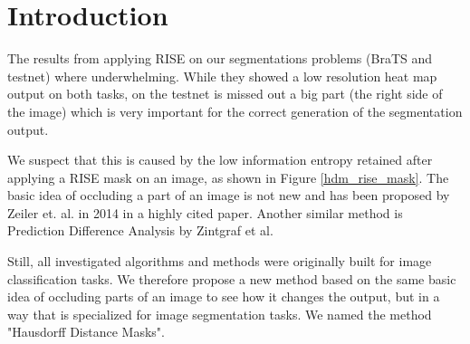 \section{Introduction}

The results from applying RISE on our segmentations problems (BraTS and testnet) where underwhelming. While they showed a low resolution heat map output on both tasks,
on the testnet is missed out a big part (the right side of the image) which is very important for the correct generation of the segmentation output.

We suspect that this is caused by the low information entropy retained after applying a RISE mask on an image, as shown in Figure \ref{hdm_rise_mask}.
The basic idea of occluding a part of an image is not new and has been proposed by Zeiler et. al. in 2014 \cite{zeiler2014visualizing} in a highly cited paper.
Another similar method is Prediction Difference Analysis \cite{zintgraf2017visualizing} by Zintgraf et al.

Still, all investigated algorithms and methods were originally built for image classification tasks. We therefore propose a new method based on the same basic idea
of occluding parts of an image to see how it changes the output, but in a way that is specialized for image segmentation tasks. We named the method "Hausdorff Distance Masks".

